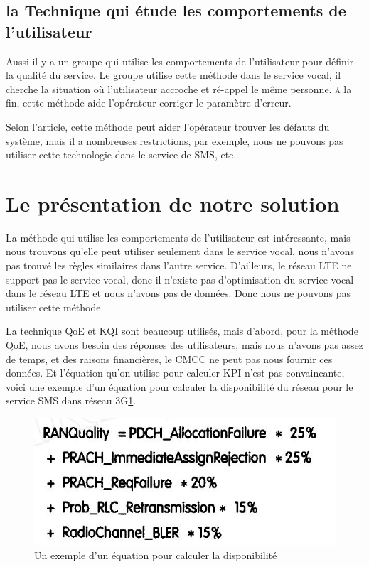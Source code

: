 \subsection{la Technique qui étude les comportements de l'utilisateur} 

Aussi il y a un groupe qui utilise les comportements de l'utilisateur pour définir la qualité du service\cite{UB}. Le groupe utilise cette méthode dans le service vocal, il cherche la situation où l'utilisateur accroche et ré-appel le même personne. \textsc{à} la fin, cette méthode aide l'opérateur corriger le paramètre d'erreur.

Selon l'article, cette méthode peut aider l'opérateur trouver les défauts du système, mais il a nombreuses restrictions, par exemple, nous ne pouvons pas utiliser cette technologie dans le service de SMS, etc.



\section{Le présentation de notre solution}

La méthode qui utilise les comportements de l'utilisateur est intéressante, mais nous trouvons qu'elle peut utiliser seulement dans le service vocal, nous n'avons pas trouvé les règles similaires dans l'autre service. D'ailleurs, le réseau LTE ne support pas le service vocal, donc il n'existe pas d'optimisation du service vocal dans le réseau LTE et nous n'avons pas de données. Donc nous ne pouvons pas utiliser cette méthode.

La technique QoE et KQI sont beaucoup utilisés, mais d'abord, pour la méthode QoE, nous avons besoin des réponses des utilisateurs, mais nous n'avons pas assez de temps, et des raisons financières, le CMCC ne peut pas nous fournir ces données. Et l'équation qu'on utilise pour calculer KPI n'est pas convaincante, voici une exemple d'un équation pour calculer la disponibilité du réseau pour le service SMS dans réseau 3G\ref{fig:kpi}. 
\begin{figure}[H]
\centering
\includegraphics[width=0.7\linewidth]{images/kpi}
\caption{Un exemple d'un équation pour calculer la disponibilité}
\label{fig:kpi}
\end{figure}

